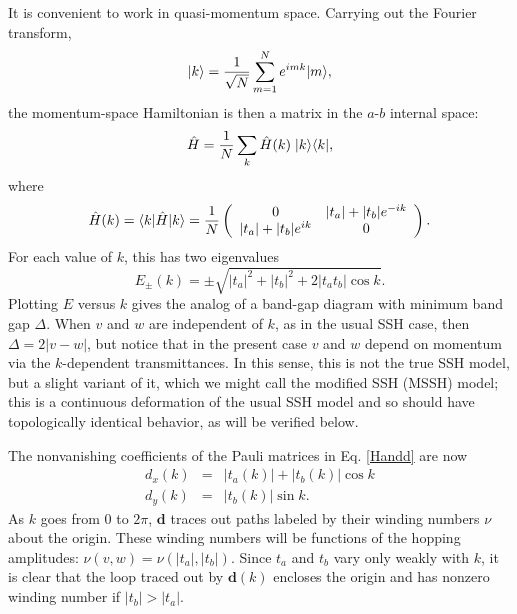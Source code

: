 \documentclass[twocolumn,amsmath, amssymb, superscriptaddress, pra]{revtex4}
\begin{document}
It is convenient to work in quasi-momentum space. Carrying out the Fourier
transform,
\begin{equation}|k\rangle ={1\over \sqrt{N}}\sum_{m=1}^N
e^{imk}|m\rangle,\end{equation}  the momentum-space Hamiltonian is then a
matrix in the $a$-$b$ internal space:
\begin{equation}\hat H =
{1\over N}\sum_k \hat H(k) \; |k\rangle\langle k|
,\end{equation} where
\begin{equation}\hat H(k) = \langle k|\hat
H|k\rangle ={1\over N}\left( \begin{array}{cc}0 & |t_a|+|t_b|e^{-ik}\\
|t_a|+|t_b|e^{ik} & 0\end{array} \right). \end{equation} For each value of
$k$, this has two eigenvalues \begin{equation}E_\pm(k)  =\pm
\sqrt{|t_a|^2+|t_b|^2+2|t_at_b|\cos k} .\end{equation} Plotting $E$ versus
$k$ gives the analog of a band-gap diagram with minimum band gap $\Delta$.
When $v$ and $w$ are independent of $k$, as in the usual SSH case, then
$\Delta =2|v-w|$, but notice that in the present case $v$ and $w$ depend on
momentum via the $k$-dependent transmittances.   In this sense, this is not
the true SSH model, but a slight variant of it, which we might call the
modified SSH (MSSH) model; this is a continuous deformation of the usual SSH
model and so should have topologically identical behavior, as will be
verified below.

The nonvanishing coefficients of the Pauli matrices in Eq. \ref{Handd} are
now
\begin{eqnarray}d_x (k)&=& |t_a(k)|+|t_b(k)|\cos k \label{dx} \\ d_y(k) &=& |t_b(k)|\sin k .\label{dy}\end{eqnarray}
As $k$ goes from $0$ to $2\pi$, $\bm d$ traces out paths labeled by their
winding numbers $\nu$ about the origin. These winding numbers will be
functions of the hopping amplitudes: $\nu (v,w)=\nu (|t_a|,|t_b|)$. Since
$t_a$ and $t_b$ vary only weakly with $k$, it is clear that the loop traced
out by $\bm d(k)$ encloses the origin and has nonzero winding number if
$|t_b|>|t_a|$.
\end{document}

